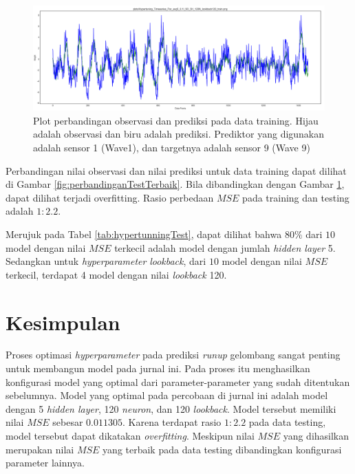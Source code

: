 \begin{figure}[h]
  \includegraphics[scale=0.34]{./images/Hypertuning_Timeseries_Par_avg5_0,1I_9O_5H_120N_lookback120_train.png}
  \caption{Plot perbandingan observasi dan prediksi pada data training. Hijau adalah observasi dan biru adalah prediksi. Prediktor yang digunakan adalah sensor 1 (Wave1), dan targetnya adalah sensor 9 (Wave 9)}
  \label{fig:perbandinganTrainTerbaik}
\end{figure}
\FloatBarrier
Perbandingan nilai observasi dan nilai prediksi untuk data training dapat dilihat di Gambar \ref{fig:perbandinganTestTerbaik}. Bila dibandingkan dengan Gambar \ref{fig:perbandinganTrainTerbaik}, dapat dilihat terjadi overfitting. Rasio perbedaan $MSE$ pada training dan testing adalah $1:2.2$.

Merujuk pada Tabel \ref{tab:hypertunningTest}, dapat dilihat bahwa $80\%$ dari $10$ model dengan nilai $MSE$ terkecil adalah model dengan jumlah \emph{hidden layer} 5. Sedangkan untuk \emph{hyperparameter} \emph{lookback}, dari $10$ model dengan nilai $MSE$ terkecil, terdapat 4 model dengan nilai \emph{lookback} 120.

\section{Kesimpulan}
Proses optimasi \emph{hyperparameter} pada prediksi \emph{runup} gelombang sangat penting untuk membangun model pada jurnal ini. Pada proses itu menghasilkan konfigurasi model yang optimal dari parameter-parameter yang sudah ditentukan sebelumnya. Model yang optimal pada percobaan di jurnal ini adalah model dengan 5 \emph{hidden layer}, 120 \emph{neuron}, dan 120 \emph{lookback}. Model tersebut memiliki nilai $MSE$ sebesar $0.011305$. Karena terdapat rasio $1:2.2$ pada data testing, model tersebut dapat dikatakan \emph{overfitting}. Meskipun nilai $MSE$ yang dihasilkan merupakan nilai $MSE$ yang terbaik pada data testing dibandingkan konfigurasi parameter lainnya.


